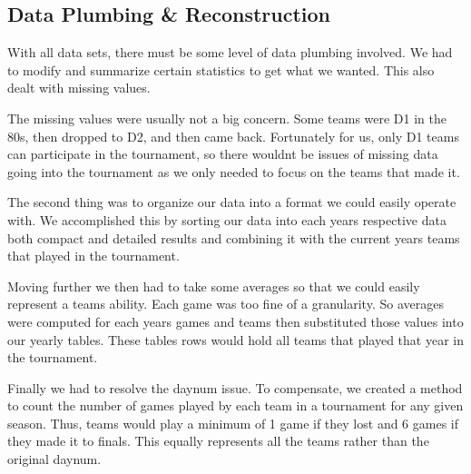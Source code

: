 \documentclass[]{scrartcl}
\begin{document}
\subsection*{Data Plumbing \& Reconstruction}

With all data sets, there must be some level of data plumbing involved. We had to modify and summarize certain statistics to get what we wanted. This also dealt with missing values.

The missing values were usually not a big concern. Some teams were D1 in the 80s, then dropped to D2, and then came back. Fortunately for us, only D1 teams can participate in the tournament, so there wouldnt be issues of missing data going into the tournament as we only needed to focus on the teams that made it.

The second thing was to organize our data into a format we could easily operate with. We accomplished this by sorting our data into each years respective data both compact and detailed results and combining it with the current years teams that played in the tournament.

Moving further we then had to take some averages so that we could easily represent a teams ability. Each game was too fine of a granularity. So averages were computed for each years games and teams then substituted those values into our yearly tables. These tables rows would hold all teams that played that year in the tournament.

Finally we had to resolve the daynum issue. To compensate, we created a method to count the number of games played by each team in a tournament for any given season. Thus, teams would play a minimum of 1 game if they lost and 6 games if they made it to finals. This equally represents all the teams rather than the original daynum.
\end{document}
